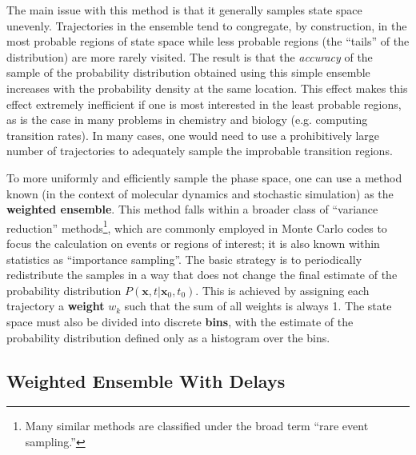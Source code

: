 \documentclass[english,letterpaper,12pt]{article}
\newcommand{\defkeywd}[1]{\textbf{#1}}
\renewcommand{\vec}[1]{\ensuremath{\mathbf{#1}}}
\begin{document}
\begin{doublespacing}
The main issue with this method is that it generally samples state space unevenly. Trajectories in the ensemble tend to congregate, by construction, in the most probable regions of state space while less probable regions (the ``tails'' of the distribution) are more rarely visited. The result is that the \textit{accuracy} of the sample of the probability distribution obtained using this simple ensemble increases with the probability density at the same location. This effect makes this effect extremely inefficient if one is most interested in the least probable regions, as is the case in many problems in chemistry and biology (e.g. computing transition rates).
In many cases,  one would need to use a prohibitively large number of trajectories to adequately sample the improbable transition regions.

To more uniformly and efficiently sample the phase space, one can use a method known (in the context of molecular dynamics and stochastic simulation) as the \defkeywd{weighted ensemble}. This method falls within a broader class of ``variance reduction'' methods\footnote{Many similar methods are classified under the broad term ``rare event sampling.'' }, which are commonly employed in Monte Carlo codes  to focus the calculation on events or regions of interest; it is also known within statistics as ``importance sampling''. The basic strategy is to periodically redistribute the samples in a way that does not change the final estimate of the probability distribution $P(\vec{x}, t | \vec{x}_0, t_0)$. This is achieved by assigning each trajectory a \defkeywd{weight} $w_k$ such that the sum of all weights is always 1. The state space must also be divided into discrete \defkeywd{bins}, with the estimate of the probability distribution defined only as a histogram over the bins.




\subsection{Weighted Ensemble With Delays} %
\label{sub:we-delays}


\end{doublespacing}
\end{document}
